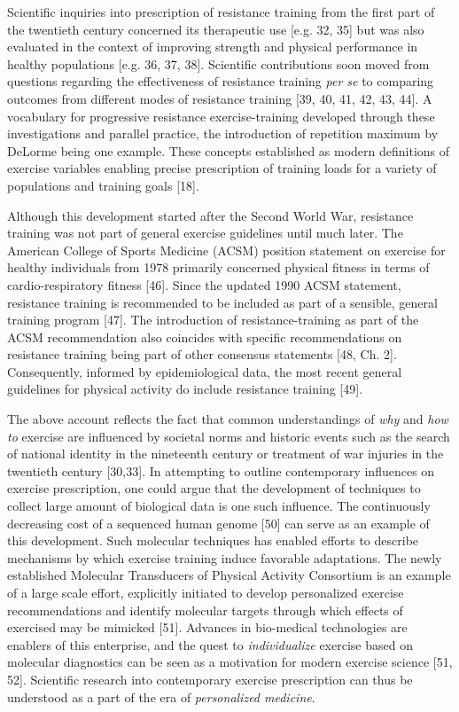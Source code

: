 \documentclass[twoside,10pt]{gihclass} %
\begin{document}
Scientific inquiries into prescription of resistance training from the first part of the twentieth century concerned its therapeutic use
{[}e.g. 32, 35{]}
but was also evaluated in the context of improving strength and physical performance in healthy populations
{[}e.g. 36, 37, 38{]}.
Scientific contributions soon moved from questions regarding the effectiveness of resistance training \emph{per se} to comparing outcomes from different modes of resistance training
{[}39, 40, 41, 42, 43, 44{]}.
A vocabulary for progressive resistance exercise-training developed through these investigations and parallel practice,
the introduction of repetition maximum by DeLorme being one example. These concepts established as modern definitions of exercise variables enabling precise prescription of training loads for a variety of populations and training goals
{[}18{]}.

Although this development started after the Second World War, resistance training was not part of general exercise guidelines until much later.
The American College of Sports Medicine (ACSM) position statement on exercise for healthy individuals from 1978 primarily concerned physical fitness in terms of cardio-respiratory fitness
{[}46{]}.
Since the updated 1990 ACSM statement, resistance training is recommended to be included as part of a sensible, general training program
{[}47{]}.
The introduction of resistance-training as part of the ACSM recommendation also coincides with specific recommendations on resistance training being part of other consensus statements
{[}48, Ch. 2{]}.
Consequently, informed by epidemiological data, the most recent general guidelines for physical activity do include resistance training {[}49{]}.

The above account reflects the fact that common understandings of \emph{why} and \emph{how to} exercise are influenced by societal norms and historic events such as the search of national identity in the nineteenth century or treatment of war injuries in the twentieth century
{[}30,33{]}.
In attempting to outline contemporary influences on exercise prescription, one could argue that the development of techniques to collect large amount of biological data is one such influence. The continuously decreasing cost of a sequenced human genome
{[}50{]} can serve as an example of this development.
Such molecular techniques has enabled efforts to describe mechanisms by which exercise training induce favorable adaptations. The newly established Molecular Transducers of Physical Activity Consortium is an example of a large scale effort, explicitly initiated to develop personalized exercise recommendations and identify molecular targets through which effects of exercised may be mimicked
{[}51{]}.
Advances in bio-medical technologies are enablers of this enterprise, and the quest to \emph{individualize} exercise based on molecular diagnostics can be seen as a motivation for modern exercise science
{[}51, 52{]}.
Scientific research into contemporary exercise prescription can thus be understood as a part of the era of \emph{personalized medicine}.
\end{document}
